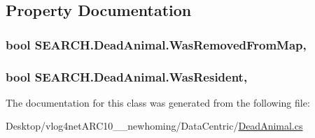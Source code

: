 \subsection{Property Documentation}
\hypertarget{class_s_e_a_r_c_h_1_1_dead_animal_a2f76897f9f6724ef178f20e5fae18fab}{
\subsubsection[{Was\-Removed\-From\-Map}]{\setlength{\rightskip}{0pt plus 5cm}bool S\-E\-A\-R\-C\-H.\-Dead\-Animal.\-Was\-Removed\-From\-Map\hspace{0.3cm}{\ttfamily [get]}, {\ttfamily [set]}}}\label{class_s_e_a_r_c_h_1_1_dead_animal_a2f76897f9f6724ef178f20e5fae18fab}
\hypertarget{class_s_e_a_r_c_h_1_1_dead_animal_a1bfa253d1b2f728f4b4682d0dbd0cc71}{
\subsubsection[{Was\-Resident}]{\setlength{\rightskip}{0pt plus 5cm}bool S\-E\-A\-R\-C\-H.\-Dead\-Animal.\-Was\-Resident\hspace{0.3cm}{\ttfamily [get]}, {\ttfamily [set]}}}\label{class_s_e_a_r_c_h_1_1_dead_animal_a1bfa253d1b2f728f4b4682d0dbd0cc71}


The documentation for this class was generated from the following file\-:\begin{DoxyCompactItemize}
\item 
Desktop/vlog4net\-A\-R\-C10\-\_\-\_\-newhoming/\-Data\-Centric/\hyperlink{_dead_animal_8cs}{Dead\-Animal.\-cs}\end{DoxyCompactItemize}
